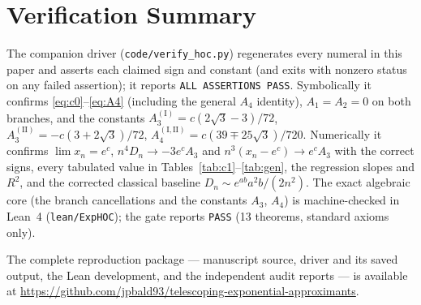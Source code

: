 \documentclass[11pt]{article}
\theoremstyle{definition}
\begin{document}
\section{Verification Summary}\label{app:verify}
The companion driver (\texttt{code/verify\_hoc.py}) regenerates every numeral in
this paper and asserts each claimed sign and constant (and exits with nonzero
status on any failed assertion); it reports \texttt{ALL ASSERTIONS PASS}.
Symbolically it confirms \eqref{eq:c0}--\eqref{eq:A4} (including the general
$A_4$ identity), $A_1=A_2=0$ on both branches, and the constants
$A_3^{(\mathrm{I})}=c(2\sqrt3-3)/72$, $A_3^{(\mathrm{II})}=-c(3+2\sqrt3)/72$,
$A_4^{(\mathrm{I},\mathrm{II})}=c(39\mp25\sqrt3)/720$. Numerically it confirms
$\lim x_n=e^{c}$, $n^4D_n\to-3e^{c}A_3$ and $n^3(x_n-e^{c})\to e^{c}A_3$ with the
correct signs, every tabulated value in Tables~\ref{tab:c1}--\ref{tab:gen}, the
regression slopes and $R^2$, and the corrected classical baseline
$D_n\sim e^{ab}a^2b/(2n^2)$. The exact algebraic core (the branch cancellations
and the constants $A_3$, $A_4$) is machine-checked in Lean~4
(\texttt{lean/ExpHOC}); the gate reports \texttt{PASS} (13 theorems, standard
axioms only).

The complete reproduction package --- manuscript source, driver and its saved
output, the Lean development, and the independent audit reports --- is available
at \url{https://github.com/jpbald93/telescoping-exponential-approximants}.
\end{document}
